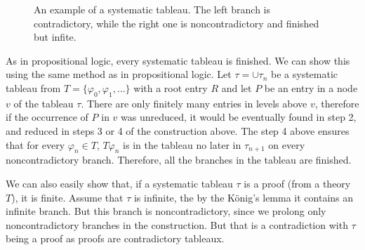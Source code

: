 \begin{figure}[t]
\centering
{}
\caption{An example of a systematic tableau. The left branch is contradictory, while the right one is noncontradictory and finished but infite.}
\label{fig:tableau_systematic}
\end{figure}


As in propositional logic, every systematic tableau is finished. We can show this using the same method as in propositional logic. Let $\tau = \cup \tau_n$ be a systematic tableau from $T = \{\varphi_0, \varphi_1, \dots\}$ with a root entry $R$ and let $P$ be an entry in a node $v$ of the tableau $\tau$. There are only finitely many entries in levels above $v$, therefore if the occurrence of $P$ in $v$ was unreduced, it would be eventually found in step 2, and reduced in steps 3 or 4 of the construction above. The step 4 above ensures that for every $\varphi_n \in T$, $T \varphi_n$ is in the tableau no later in $\tau_{n+1}$ on every noncontradictory branch. Therefore, all the branches in the tableau are finished.

We can also easily show that, if a systematic tableau $\tau$ is a proof (from a theory $T$), it is finite. Assume that $\tau$ is infinite, the by the König's lemma it contains an infinite branch. But this branch is noncontradictory, since we prolong only noncontradictory branches in the construction. But that is a contradiction with $\tau$ being a proof as proofs are contradictory tableaux.